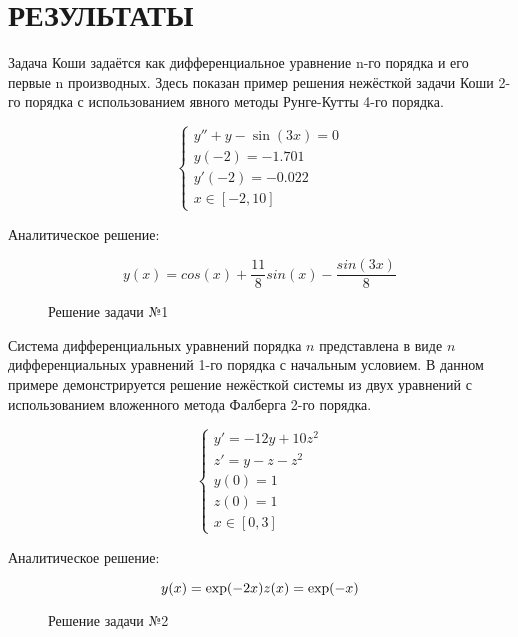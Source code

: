 \section{РЕЗУЛЬТАТЫ}



Задача Коши задаётся как дифференциальное уравнение n-го порядка и его первые n производных. Здесь показан пример решения нежёсткой
задачи Коши 2-го порядка с использованием явного методы Рунге-Кутты 4-го порядка.

$$
\begin{cases}
	y'' + y - \sin(3x) = 0\\
	y(-2) = -1.701\\
	y'(-2) = -0.022\\
	x \in [-2, 10]
\end{cases}
$$

Аналитическое решение:

$$
y(x) = cos(x) + \dfrac{11}{8}sin(x) - \dfrac{sin(3x)}{8}
$$

\begin{figure}
    
    \caption{Решение задачи №1}
    \label{fig:task1}
\end{figure}

Система дифференциальных уравнений порядка $n$ представлена в виде $n$ дифференциальных уравнений 1-го порядка с начальным условием. В
данном примере демонстрируется решение нежёсткой системы из двух уравнений с использованием вложенного метода Фалберга 2-го порядка.

$$
\begin{cases}
    y' = -12y + 10z^2\\
    z' = y - z - z^2\\
    y(0) = 1\\
    z(0) = 1\\
    x \in [0, 3]
\end{cases}
$$

Аналитическое решение:

$$
y(x) = \exp(-2x)\\
z(x) = \exp(-x)
$$

\begin{figure}
    
    \caption{Решение задачи №2}
    \label{fig:task2}
\end{figure}

